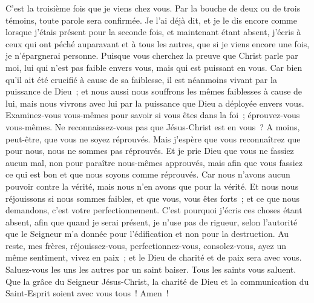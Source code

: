 \begin{multicols}{2}
\VerseOne{}C'est la troisième fois que je viens chez vous. Par la bouche de deux ou de trois témoins, toute parole sera confirmée.
Je l'ai déjà dit, et je le dis encore comme lorsque j'étais présent pour la seconde fois, et maintenant étant absent, j'écris à ceux qui ont péché auparavant et à tous les autres, que si je viens encore une fois, je n'épargnerai personne.
Puisque vous cherchez la preuve que Christ parle par moi, lui qui n'est pas faible envers vous, mais qui est puissant en vous.
Car bien qu'il ait été crucifié à cause de sa faiblesse, il est néanmoins vivant par la puissance de Dieu~; et nous aussi nous souffrons les mêmes faiblesses à cause de lui, mais nous vivrons avec lui par la puissance que Dieu a déployée envers vous.
Examinez-vous vous-mêmes pour savoir si vous êtes dans la foi~; éprouvez-vous vous-mêmes. Ne reconnaissez-vous pas que Jésus-Christ est en vous~? A moins, peut-être, que vous ne soyez réprouvés.
Mais j'espère que vous reconnaîtrez que pour nous, nous ne sommes pas réprouvés.
Et je prie Dieu que vous ne fassiez aucun mal, non pour paraître nous-mêmes approuvés, mais afin que vous fassiez ce qui est bon et que nous soyons comme réprouvés.
Car nous n'avons aucun pouvoir contre la vérité, mais nous n'en avons que pour la vérité.
Et nous nous réjouissons si nous sommes faibles, et que vous, vous êtes forts~; et ce que nous demandons, c'est votre perfectionnement.
C'est pourquoi j'écris ces choses étant absent, afin que quand je serai présent, je n'use pas de rigueur, selon l'autorité que le Seigneur m'a donnée pour l'édification et non pour la destruction.
Au reste, mes frères, réjouissez-vous, perfectionnez-vous, consolez-vous, ayez un même sentiment, vivez en paix~; et le Dieu de charité et de paix sera avec vous.
Saluez-vous les uns les autres par un saint baiser. Tous les saints vous saluent.
Que la grâce du Seigneur Jésus-Christ, la charité de Dieu et la communication du Saint-Esprit soient avec vous tous~! Amen~!
\PPE{}
\end{multicols}
